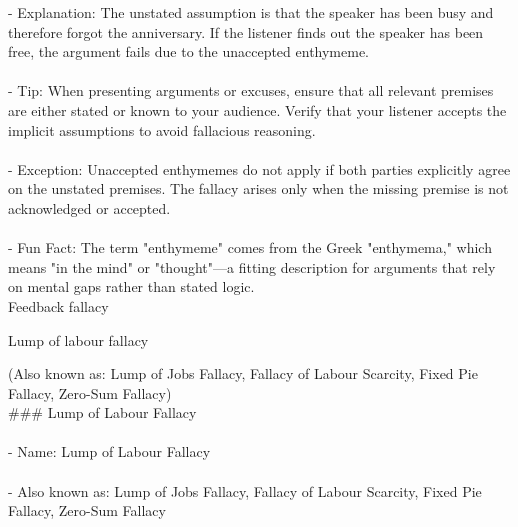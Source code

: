 \documentclass[a4paper,12pt,single,pdftex]{scrbook}
\begin{document}
    
        - Explanation: The unstated assumption is that the speaker has been busy and therefore forgot the anniversary. If the listener finds out the speaker has been free, the argument fails due to the unaccepted enthymeme. 
    \\

    
      
    \\

    
      - Tip: When presenting arguments or excuses, ensure that all relevant premises are either stated or known to your audience. Verify that your listener accepts the implicit assumptions to avoid fallacious reasoning. 
    \\

    
      
    \\

    
      - Exception: Unaccepted enthymemes do not apply if both parties explicitly agree on the unstated premises. The fallacy arises only when the missing premise is not acknowledged or accepted. 
    \\

    
      
    \\

    
      - Fun Fact: The term "enthymeme" comes from the Greek "enthymema," which means "in the mind" or "thought"—a fitting description for arguments that rely on mental gaps rather than stated logic. 
    \\

  

Feedback fallacy

Lump of labour fallacy
    
      (Also known as: Lump of Jobs Fallacy, Fallacy of Labour Scarcity, Fixed Pie Fallacy, Zero-Sum Fallacy)
    \\

  
    
      \#\#\# Lump of Labour Fallacy
    \\

    
      
    \\

    
      - Name: Lump of Labour Fallacy
    \\

    
      
    \\

    
      - Also known as: Lump of Jobs Fallacy, Fallacy of Labour Scarcity, Fixed Pie Fallacy, Zero-Sum Fallacy
    \\
\end{document}
